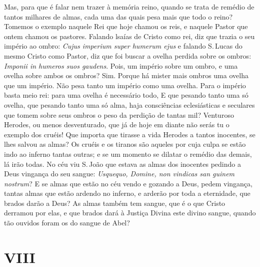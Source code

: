 Mas, para que é falar nem trazer à memória reino, quando se trata de
remédio de tantos milhares de almas, cada uma das quais pesa mais que
todo o reino? Tomemos o exemplo naquele Rei que hoje chamou os reis, e
naquele Pastor que ontem chamou os pastores. Falando lsaías de Cristo
como rei, diz que trazia o seu império ao ombro: \emph{Cujus imperium
super humerum ejus} e falando S.\,Lucas do mesmo Cristo como Pastor,
diz que foi buscar a ovelha perdida sobre os ombros: \emph{Imponii in
humeros suos gaudens}. Pois, um império sobre um ombro, e uma
ovelha sobre ambos os ombros? Sim. Porque há mister mais ombros uma
ovelha que um império. Não pesa tanto um império como uma ovelha. Para o
império basta meio rei: para uma ovelha é necessário todo, E que pesando
tanto uma só ovelha, que pesando tanto uma só alma, haja consciências
eclesiásticas e seculares que tomem sobre seus ombros o peso da perdição
de tantas mil? Venturoso Herodes, ou menos desventurado, que já de hoje
em diante não serás tu o exemplo dos cruéis! Que importa que tirasse a
vida Herodes a tantos inocentes, se lhes salvou as almas? Os cruéis e os
tiranos são aqueles por cuja culpa se estão indo ao inferno tantas
outras; e se um momento se dilatar o remédio das demais, lá irão todas.
No céu viu S.\,João que estava as almas dos inocentes pedindo a Deus
vingança do seu sangue: \emph{Usquequo, Domine, non vindicas san guinem
nostrum}? E se almas que estão no céu vendo e gozando a
Deus, pedem vingança, tantas almas que estão ardendo no inferno, e
arderão por toda a eternidade, que brados darão a Deus?
As almas também tem sangue, que é o que Cristo derramou por elas, e que
brados dará à Justiça Divina este divino sangue, quando tão ouvidos
foram os do sangue de Abel?

\section*{VIII}

